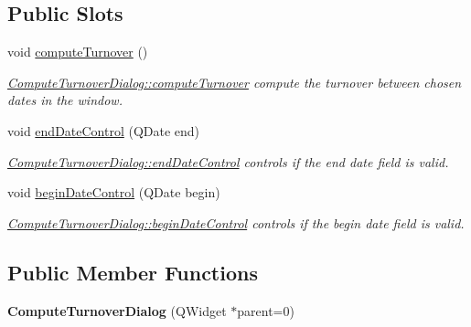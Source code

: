 \subsection*{Public Slots}
\begin{DoxyCompactItemize}
\item 
\hypertarget{classGui_1_1Dialogs_1_1ComputeTurnoverDialog_ab4d2a48bffed8c09e3d16e2849fd4b0e}{void \hyperlink{classGui_1_1Dialogs_1_1ComputeTurnoverDialog_ab4d2a48bffed8c09e3d16e2849fd4b0e}{compute\-Turnover} ()}\label{classGui_1_1Dialogs_1_1ComputeTurnoverDialog_ab4d2a48bffed8c09e3d16e2849fd4b0e}

\begin{DoxyCompactList}\small\item\em \hyperlink{classGui_1_1Dialogs_1_1ComputeTurnoverDialog_ab4d2a48bffed8c09e3d16e2849fd4b0e}{Compute\-Turnover\-Dialog\-::compute\-Turnover} compute the turnover between chosen dates in the window. \end{DoxyCompactList}\item 
void \hyperlink{classGui_1_1Dialogs_1_1ComputeTurnoverDialog_aec195a2ea796179dbf584dd806077164}{end\-Date\-Control} (Q\-Date end)
\begin{DoxyCompactList}\small\item\em \hyperlink{classGui_1_1Dialogs_1_1ComputeTurnoverDialog_aec195a2ea796179dbf584dd806077164}{Compute\-Turnover\-Dialog\-::end\-Date\-Control} controls if the {\itshape end} date field is valid. \end{DoxyCompactList}\item 
void \hyperlink{classGui_1_1Dialogs_1_1ComputeTurnoverDialog_ae7efebd5303635280c02072567298df7}{begin\-Date\-Control} (Q\-Date begin)
\begin{DoxyCompactList}\small\item\em \hyperlink{classGui_1_1Dialogs_1_1ComputeTurnoverDialog_ae7efebd5303635280c02072567298df7}{Compute\-Turnover\-Dialog\-::begin\-Date\-Control} controls if the {\itshape begin} date field is valid. \end{DoxyCompactList}\end{DoxyCompactItemize}
\subsection*{Public Member Functions}
\begin{DoxyCompactItemize}
\item 
\hypertarget{classGui_1_1Dialogs_1_1ComputeTurnoverDialog_a0f720f3d04ef26c3086e18a9d1e1606d}{{\bfseries Compute\-Turnover\-Dialog} (Q\-Widget $\ast$parent=0)}\label{classGui_1_1Dialogs_1_1ComputeTurnoverDialog_a0f720f3d04ef26c3086e18a9d1e1606d}

\end{DoxyCompactItemize}


